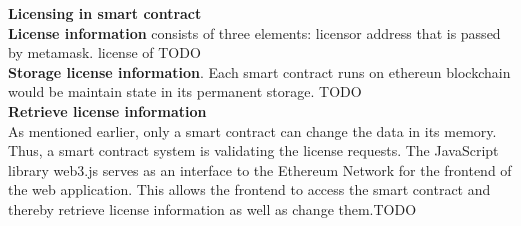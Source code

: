 \textbf{Licensing in smart contract} \\
\textbf{License information} consists of three elements: licensor address that is passed by metamask. license of TODO\\
\textbf{Storage license information}. Each smart contract runs on ethereun blockchain would be maintain state in its permanent storage. TODO\\
\textbf{Retrieve license information}\\
As mentioned earlier, only a smart contract can change the data in its memory.
Thus, a smart contract system is validating the license requests. The JavaScript
library web3.js serves as an interface to the Ethereum Network for the frontend
of the web application. This allows the frontend to access the smart contract and
thereby retrieve license information as well as change them.TODO\\

